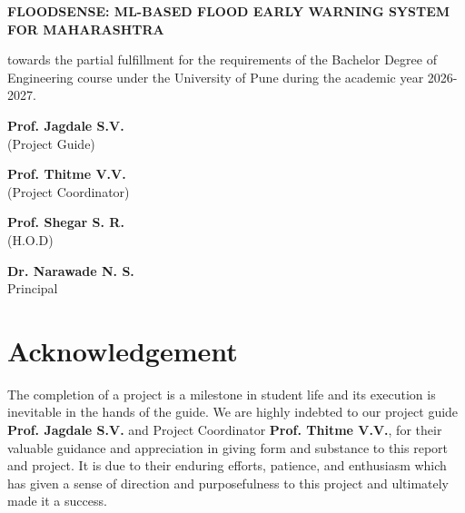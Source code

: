 \documentclass[a4paper,12pt]{report}
\begin{document}
\begin{titlepage}
\begin{center}
{\Large \textbf{FLOODSENSE: ML-BASED FLOOD EARLY WARNING SYSTEM FOR MAHARASHTRA}}\\[0.48cm]

{\normalsize \parbox{0.86\textwidth}{\centering
towards the partial fulfillment for the requirements of the Bachelor Degree of\\
Engineering course under the University of Pune during the academic year 2026-2027.
}}

\vspace{2.2cm}

\noindent
\begin{minipage}[t]{0.42\textwidth}
\raggedright
\textbf{Prof. Jagdale S.V.}\\
(Project Guide)
\end{minipage}
\hfill
\begin{minipage}[t]{0.42\textwidth}
\raggedleft
\textbf{Prof. Thitme V.V.}\\
(Project Coordinator)
\end{minipage}

\vspace{1.4cm}

\noindent
\begin{minipage}[t]{0.42\textwidth}
\raggedright
\textbf{Prof. Shegar S. R.}\\
(H.O.D)
\end{minipage}
\hfill
\begin{minipage}[t]{0.42\textwidth}
\raggedleft
\textbf{Dr. Narawade N. S.}\\
Principal
\end{minipage}
\endgroup
\end{center}
\end{titlepage}
\restoregeometry

\chapter*{Acknowledgement}
The completion of a project is a milestone in student life and its execution is inevitable in the hands of the guide. We are highly indebted to our project guide \textbf{Prof. Jagdale S.V.} and Project Coordinator \textbf{Prof. Thitme V.V.}, for their valuable guidance and appreciation in giving form and substance to this report and project. It is due to their enduring efforts, patience, and enthusiasm which has given a sense of direction and purposefulness to this project and ultimately made it a success.
\end{document}
